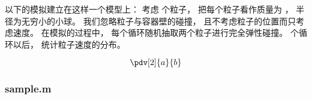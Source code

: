
以下的模拟建立在这样一个模型上： 考虑  个粒子， 把每个粒子看作质量为 ， 半径为无穷小的小球。 我们忽略粒子与容器壁的碰撞， 且不考虑粒子的位置而只考虑速度。 在模拟的过程中， 每个循环随机抽取两个粒子进行完全弹性碰撞。  个循环以后， 统计粒子速度的分布。

\begin{equation}
\pdv[2]{a}{b}
\end{equation}

\subsubsection{sample.m}
